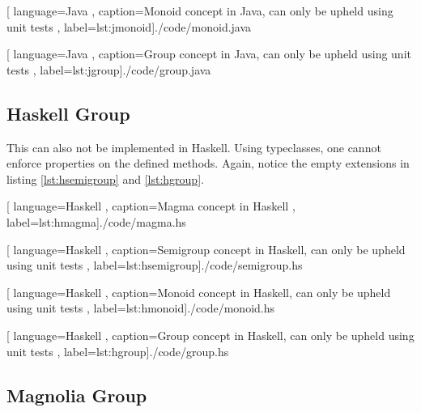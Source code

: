 \begin{center}
  
    [ language=Java
    , caption={Monoid concept in Java, can only be upheld using unit tests}
    , label=lst:jmonoid]{./code/monoid.java}
\end{center}

\begin{center}
  
    [ language=Java
    , caption={Group concept in Java, can only be upheld using unit tests}
    , label=lst:jgroup]{./code/group.java}
\end{center}


\subsection{Haskell Group}

This can also not be implemented in Haskell. Using typeclasses, one cannot
enforce properties on the defined methods. Again, notice the empty extensions
in listing \ref{lst:hsemigroup} and \ref{lst:hgroup}.

\begin{center}
  
    [ language=Haskell
    , caption={Magma concept in Haskell}
    , label=lst:hmagma]{./code/magma.hs}
\end{center}

\begin{center}
  
    [ language=Haskell
    , caption={Semigroup concept in Haskell, can only be upheld using unit tests}
    , label=lst:hsemigroup]{./code/semigroup.hs}
\end{center}

\begin{center}
  
    [ language=Haskell
    , caption={Monoid concept in Haskell, can only be upheld using unit tests}
    , label=lst:hmonoid]{./code/monoid.hs}
\end{center}

\begin{center}
  
    [ language=Haskell
    , caption={Group concept in Haskell, can only be upheld using unit tests}
    , label=lst:hgroup]{./code/group.hs}
\end{center}

\subsection{Magnolia Group}

